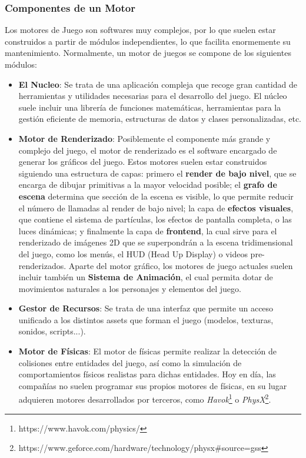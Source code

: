 \subsubsection{Componentes de un Motor}
Los motores de Juego son softwares muy complejos, por lo que suelen estar construidos a partir de módulos independientes, lo que facilita enormemente su mantenimiento. Normalmente, un motor de juegos se compone de los siguientes módulos\cite{game_engine_architecture}:
\begin{itemize}
\item\textbf{El Nucleo}: Se trata de una aplicación compleja que recoge gran cantidad de herramientas y utilidades necesarias para el desarrollo del juego. El núcleo suele incluir una librería de funciones matemáticas, herramientas para la gestión eficiente de memoria, estructuras de datos y clases personalizadas, etc.
\item\textbf{Motor de Renderizado}: Posiblemente el componente más grande y complejo del juego, el motor de renderizado es el software encargado de generar los gráficos del juego. Estos motores suelen estar construidos siguiendo una estructura de capas: primero el \textbf{render de bajo nivel}, que se encarga de dibujar primitivas a la mayor velocidad posible; el \textbf{grafo de escena} determina que sección de la escena es visible, lo que permite reducir el número de llamadas al render de bajo nivel; la capa de \textbf{efectos visuales}, que contiene el sistema de partículas, los efectos de pantalla completa, o las luces dinámicas; y finalmente la capa de \textbf{frontend}, la cual sirve para el renderizado de imágenes 2D que se superpondrán a la escena tridimensional del juego, como los menús, el HUD (Head Up Display) o videos pre-renderizados. Aparte del motor gráfico, los motores de juego actuales suelen incluir también un \textbf{Sistema de Animación}, el cual permita dotar de movimientos naturales a los personajes y elementos del juego. 
\item\textbf{Gestor de Recursos}: Se trata de una interfaz que permite un acceso unificado a los distintos assets que forman el juego (modelos, texturas, sonidos, scripts...). 
\item\textbf{Motor de Físicas}: El motor de físicas permite realizar la detección de colisiones entre entidades del juego, así como la simulación de comportamientos físicos realistas para dichas entidades. Hoy en día, las compañías no suelen programar sus propios motores de físicas, en su lugar adquieren motores desarrollados por terceros, como \textit{Havok}\footnote{https://www.havok.com/physics/} o \textit{PhysX}\footnote{https://www.geforce.com/hardware/technology/physx\#source=gss}.

\end{itemize}
